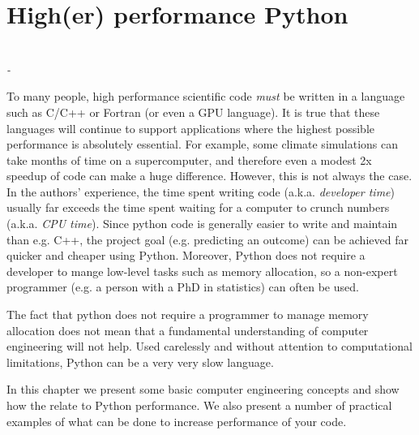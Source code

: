 \chapter{High(er) performance Python}
\label{chapter:performance}
\begin{center}
  {\Large\textit{\\ \vspace{0.1in} - }}
\end{center}
\vspace{0.2in}

To many people, high performance scientific code \emph{must} be written in a language such as C/C++ or Fortran (or even a GPU language).  It is true that these languages will continue to support applications where the highest possible performance is absolutely essential.  For example, some climate simulations can take months of time on a supercomputer, and therefore even a modest 2x speedup of code can make a huge difference.  However, this is not always the case.  In the authors' experience, the time spent writing code (a.k.a. \emph{developer time}) usually far exceeds the time spent waiting for a computer to crunch numbers (a.k.a. \emph{CPU time}).   Since python code is generally easier to write and maintain than e.g. C++, the project goal (e.g. predicting an outcome) can be achieved far quicker and cheaper using Python.  Moreover, Python does not require a developer to mange low-level tasks such as memory allocation, so a non-expert programmer (e.g. a person with a PhD in statistics) can often be used.

The fact that python does not require a programmer to manage memory allocation does not mean that a fundamental understanding of computer engineering will not help.  Used carelessly and without attention to computational limitations, Python can be a very very slow language.

In this chapter we present some basic computer engineering concepts and show how the relate to Python performance.  We also present a number of practical examples of what can be done to increase performance of your code.

